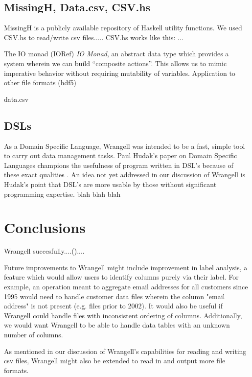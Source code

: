 \documentclass[preprint,nocopyrightspace]{sig-alternate}
\begin{document}
\subsection{MissingH, Data.csv, CSV.hs}
MissingH is a publicly available repository of Haskell utility functions. We used CSV.hs to read/write csv files..... CSV.hs works like this: ... 


The IO monad (IORef)
 \emph{IO Monad}, an abstract data type which provides a system wherein we can build ``composite actions''. This allows us to mimic imperative behavior without requiring mutability of variables.  
Application to other file formats (hdf5)

data.csv

\subsection{DSLs}
\cite{DSLs}
As a Domain Specific Language, Wrangell was intended to be a fast, simple tool to carry out data management tasks. Paul Hudak's paper on Domain Specific Languages champions the usefulness of program written in DSL's because of these exact qualities \cite{DSLs}. An idea not yet addressed in our discussion of Wrangell is Hudak's point that DSL's are more usable by those without significant programming expertise. blah blah blah 




\section{Conclusions}
Wrangell succesfully....().... 

Future improvements to Wrangell might include improvement in label analysis, a feature which would allow users to identify columns purely via their label. For example, an operation meant to aggregate email addresses for all customers since 1995 would need to handle customer data files wherein the column "email address" is not present (e.g. files prior to 2002). It would also be useful if Wrangell could handle files with inconsistent ordering of columns. Additionally, we would want Wrangell to be able to handle data tables with an unknown number of columns. 

As mentioned in our discussion of Wrangell's capabilities for reading and writing csv files, Wrangell might also be extended to read in and output more file formats.   



\end{document}
